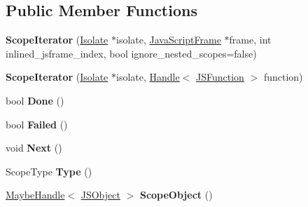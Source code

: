 \subsection*{Public Member Functions}
\begin{DoxyCompactItemize}
\item 
\hypertarget{classv8_1_1internal_1_1_scope_iterator_a9b4ac5ee32ac153857e1854ac5f217f3}{}{\bfseries Scope\+Iterator} (\hyperlink{classv8_1_1internal_1_1_isolate}{Isolate} $\ast$isolate, \hyperlink{classv8_1_1internal_1_1_java_script_frame}{Java\+Script\+Frame} $\ast$frame, int inlined\+\_\+jsframe\+\_\+index, bool ignore\+\_\+nested\+\_\+scopes=false)\label{classv8_1_1internal_1_1_scope_iterator_a9b4ac5ee32ac153857e1854ac5f217f3}

\item 
\hypertarget{classv8_1_1internal_1_1_scope_iterator_ad8c8fb113efb2ce5476078627fea56d3}{}{\bfseries Scope\+Iterator} (\hyperlink{classv8_1_1internal_1_1_isolate}{Isolate} $\ast$isolate, \hyperlink{classv8_1_1internal_1_1_handle}{Handle}$<$ \hyperlink{classv8_1_1internal_1_1_j_s_function}{J\+S\+Function} $>$ function)\label{classv8_1_1internal_1_1_scope_iterator_ad8c8fb113efb2ce5476078627fea56d3}

\item 
\hypertarget{classv8_1_1internal_1_1_scope_iterator_ac44e67b01409ca5d3d12ea062f9772d1}{}bool {\bfseries Done} ()\label{classv8_1_1internal_1_1_scope_iterator_ac44e67b01409ca5d3d12ea062f9772d1}

\item 
\hypertarget{classv8_1_1internal_1_1_scope_iterator_af35b8cb9f64079c2b0d86d07f2828825}{}bool {\bfseries Failed} ()\label{classv8_1_1internal_1_1_scope_iterator_af35b8cb9f64079c2b0d86d07f2828825}

\item 
\hypertarget{classv8_1_1internal_1_1_scope_iterator_a6f0a4ba9b811b41b1ced4133686a89b5}{}void {\bfseries Next} ()\label{classv8_1_1internal_1_1_scope_iterator_a6f0a4ba9b811b41b1ced4133686a89b5}

\item 
\hypertarget{classv8_1_1internal_1_1_scope_iterator_aec1013abf425ee2a3a52b7c159eeddf4}{}Scope\+Type {\bfseries Type} ()\label{classv8_1_1internal_1_1_scope_iterator_aec1013abf425ee2a3a52b7c159eeddf4}

\item 
\hypertarget{classv8_1_1internal_1_1_scope_iterator_a1a3e44a60a5785046ef0389aa7eec27e}{}\hyperlink{classv8_1_1internal_1_1_maybe_handle}{Maybe\+Handle}$<$ \hyperlink{classv8_1_1internal_1_1_j_s_object}{J\+S\+Object} $>$ {\bfseries Scope\+Object} ()\label{classv8_1_1internal_1_1_scope_iterator_a1a3e44a60a5785046ef0389aa7eec27e}


\end{DoxyCompactItemize}
